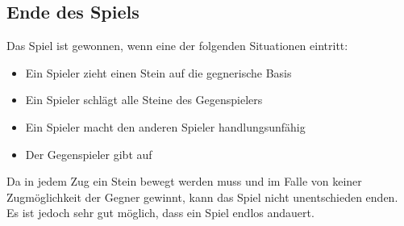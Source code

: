 \newpage

\subsection*{Ende des Spiels}
Das Spiel ist gewonnen, wenn eine der folgenden Situationen eintritt:
\begin{itemize}
\item Ein Spieler zieht einen Stein auf die gegnerische Basis
\item Ein Spieler schlägt alle Steine des Gegenspielers
\item Ein Spieler macht den anderen Spieler handlungsunfähig
\item Der Gegenspieler gibt auf
\end{itemize}

Da in jedem Zug ein Stein bewegt werden muss und im Falle von keiner Zugmöglichkeit der Gegner gewinnt, kann das Spiel nicht unentschieden enden. Es ist jedoch sehr gut möglich, dass ein Spiel endlos andauert.